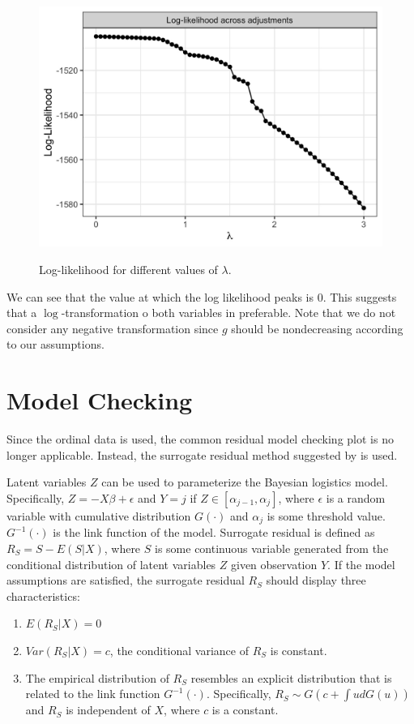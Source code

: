 \documentclass[10pt]{jmlr}%
\begin{document}
\begin{figure}[htbp]
	\centering
	\caption{Log-likelihood for different values of $\lambda$.}
	\includegraphics[width=0.7\linewidth]{BocCox}
	\label{fig:boxcox}
\end{figure}

We can see that the value at which the log likelihood peaks is 0. This suggests that a $\log$-transformation o  both variables in preferable. Note that we do not consider any negative transformation since $g$ should be nondecreasing according to our assumptions. 

\section{Model Checking}
\label{appendix:assumption}

Since the ordinal data is used, the common residual model checking plot is no longer applicable. Instead, the surrogate residual method suggested by \cite{Liu2018} is used. 

Latent variables $Z$ can be used to parameterize the Bayesian logistics model. Specifically, $Z=-X\beta+\epsilon$ and $Y=j$ if $Z\in[\alpha_{j-1},\alpha_{j}]$, where $\epsilon$ is a random variable with cumulative distribution $G(\cdot)$ and $\alpha_{j}$ is some threshold value. $G^{-1}(\cdot)$ is the link function of the model. Surrogate residual is defined as $R_S=S-E(S|X)$, where $S$ is some continuous variable generated from the conditional distribution of latent variables $Z$ given observation $Y$. If the model assumptions are satisfied, the surrogate residual $R_S$ should display three characteristics: 

\begin{enumerate}
	\item $E(R_S|X)=0$
	\item $Var(R_S|X)=c$, the conditional variance of $R_S$ is constant.
	\item The empirical distribution of $R_S$ resembles an explicit distribution that is related to the link function $G^{-1}(\cdot)$. Specifically, $R_S\sim G(c+\int ud G(u))$ and $R_S$ is independent of $X$, where $c$ is a constant.
\end{enumerate}
\end{document}
